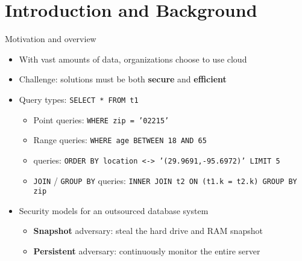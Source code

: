 \section{Introduction and Background}

	\begin{frame}{Motivation and overview}

		\begin{itemize}
			\item<1-> With vast amounts of data, organizations choose to use cloud
			\item<1-> \alert{Challenge:} solutions must be both \textbf{secure} and \textbf{efficient}
			\item<2-> Query types: \texttt{SELECT * FROM t1 }
				\begin{itemize}
					\item<1,2,6-> Point queries: \texttt{WHERE zip = '02215'}
					\item<1,3,6-> Range queries: \texttt{WHERE age BETWEEN 18 AND 65}
					\item<1,4,6-> \knn{} queries: \texttt{ORDER BY location <-> '(29.9691,-95.6972)' LIMIT 5} %
					\item<1,5,6-> \texttt{JOIN} / \texttt{GROUP BY} queries: \texttt{INNER JOIN t2 ON (t1.k = t2.k) GROUP BY zip}
				\end{itemize}
			\item<6-> Security models for an outsourced database system
				\begin{itemize}
					\item<1-5,6> \textbf{Snapshot} adversary: steal the hard drive and RAM snapshot %
					\item<1-5,7> \textbf{Persistent} adversary: continuously monitor the entire server %
				\end{itemize}
		\end{itemize}

	\end{frame}


